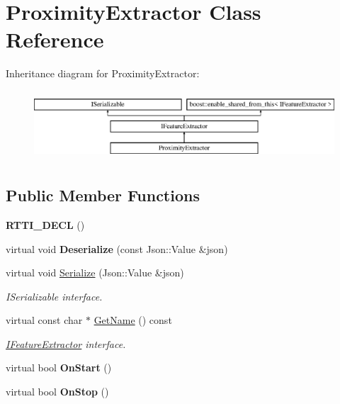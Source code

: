 \hypertarget{class_proximity_extractor}{}\section{Proximity\+Extractor Class Reference}
\label{class_proximity_extractor}
Inheritance diagram for Proximity\+Extractor\+:\begin{figure}[H]
\begin{center}
\leavevmode
\includegraphics[height=2.625000cm]{class_proximity_extractor}
\end{center}
\end{figure}
\subsection*{Public Member Functions}
\begin{DoxyCompactItemize}
\item 
\mbox{\label{class_proximity_extractor_ae0d41ca7e8d725cb72a2910ab5a03449}} 
{\bfseries R\+T\+T\+I\+\_\+\+D\+E\+CL} ()
\item 
\mbox{\label{class_proximity_extractor_a2e1633f340d03e3d4deaccbf8f8e394c}} 
virtual void {\bfseries Deserialize} (const Json\+::\+Value \&json)
\item 
\mbox{\label{class_proximity_extractor_acc27e65e7011bb41acb168cba45e5f2c}} 
virtual void \hyperlink{class_proximity_extractor_acc27e65e7011bb41acb168cba45e5f2c}{Serialize} (Json\+::\+Value \&json)
\begin{DoxyCompactList}\small\item\em I\+Serializable interface. \end{DoxyCompactList}\item 
\mbox{\label{class_proximity_extractor_a2d080fc487bb3d272c5aa0e1ba8270c7}} 
virtual const char $\ast$ \hyperlink{class_proximity_extractor_a2d080fc487bb3d272c5aa0e1ba8270c7}{Get\+Name} () const
\begin{DoxyCompactList}\small\item\em \hyperlink{class_i_feature_extractor}{I\+Feature\+Extractor} interface. \end{DoxyCompactList}\item 
\mbox{\label{class_proximity_extractor_ad41306788f77fc6805967b797509815e}} 
virtual bool {\bfseries On\+Start} ()
\item 
\mbox{\label{class_proximity_extractor_a576501217b17945c30018f17286f63c7}} 
virtual bool {\bfseries On\+Stop} ()
\end{DoxyCompactItemize}
